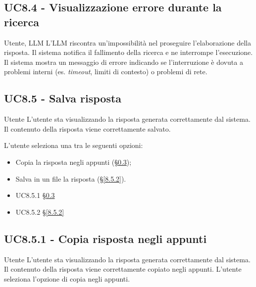 \subsection{UC8.4 - Visualizzazione errore durante la ricerca}
\label{8.4}
\makeUC{}
{Utente, LLM}
{L'LLM riscontra un'impossibilità nel proseguire l'elaborazione della risposta.}
{Il sistema notifica il fallimento della ricerca e ne interrompe l'esecuzione.}
{Il sistema mostra un messaggio di errore indicando se l'interruzione è dovuta a problemi interni (es. \textit{timeout}, limiti di contesto) o problemi di rete.}{}{}{}{}

\subsection{UC8.5 - Salva risposta}
\label{8.5}
{Utente}
{L'utente sta visualizzando la risposta generata correttamente dal sistema.}
{Il contenuto della risposta viene correttamente salvato.}
{
    L'utente seleziona una tra le seguenti opzioni:
        \begin{itemize}
            \item Copia la risposta negli appunti (§\ref{8.5.1});
            \item Salva in un file la risposta (§\ref{8.5.2}).
        \end{itemize}
}{}{}{}{
    \begin{itemize}
        \item UC8.5.1 §\ref{8.5.1}
        \item UC8.5.2 §\ref{8.5.2}
    \end{itemize}
}

\subsection{UC8.5.1 - Copia risposta negli appunti}
\label{8.5.1}
\makeUC{}
{Utente}
{L'utente sta visualizzando la risposta generata correttamente dal sistema.}
{Il contenuto della risposta viene correttamente copiato negli appunti.}
{L'utente seleziona l'opzione di copia negli appunti.}{}{}{}{}

